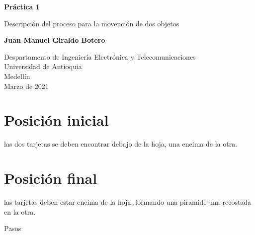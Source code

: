 \documentclass{article}
\begin{document}
\begin{titlepage}
    \begin{center}
        \vspace*{1cm}
            
        \Huge
        \textbf{Práctica 1}
            
        \vspace{0.5cm}
        \LARGE
        Descripción del proceso para la movención de dos objetos
            
        \vspace{1.5cm}
            
        \textbf{Juan Manuel Giraldo Botero}
            
        \vfill
            
        \vspace{0.8cm}
            
        \Large
        Despartamento de Ingeniería Electrónica y Telecomunicaciones\\
        Universidad de Antioquia\\
        Medellín\\
        Marzo de 2021
            
    \end{center}
\end{titlepage}

\newpage
\section{Posición inicial}
las dos tarjetas se deben encontrar debajo de la hoja, una encima de la otra.
\section{Posición final}
las tarjetas deben estar encima de la hoja, formando una piramide una recostada en la otra.

\vspace{1cm}

{\huge Pasos}
\end{document}
